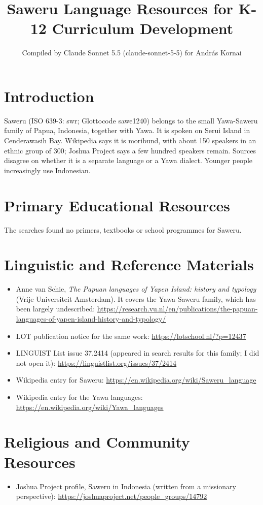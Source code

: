\documentclass[12pt]{article}
\title{Saweru Language Resources for K-12 Curriculum Development}
\author{Compiled by Claude Sonnet 5.5 (claude-sonnet-5-5) for Andr\'as Kornai}
\date{}
\begin{document}
\maketitle

\section{Introduction}
Saweru (ISO 639-3: swr; Glottocode sawe1240) belongs to the small Yawa-Saweru family of Papua, Indonesia, together with Yawa. It is spoken on Serui Island in Cenderawasih Bay. Wikipedia says it is moribund, with about 150 speakers in an ethnic group of 300; Joshua Project says a few hundred speakers remain. Sources disagree on whether it is a separate language or a Yawa dialect. Younger people increasingly use Indonesian.

\section{Primary Educational Resources}
The searches found no primers, textbooks or school programmes for Saweru.

\section{Linguistic and Reference Materials}
\begin{itemize}
\item Anne van Schie, \emph{The Papuan languages of Yapen Island: history and typology} (Vrije Universiteit Amsterdam). It covers the Yawa-Saweru family, which has been largely undescribed: \url{https://research.vu.nl/en/publications/the-papuan-languages-of-yapen-island-history-and-typology/}
\item LOT publication notice for the same work: \url{https://lotschool.nl/?p=12437}
\item LINGUIST List issue 37.2414 (appeared in search results for this family; I did not open it): \url{https://linguistlist.org/issues/37/2414}
\item Wikipedia entry for Saweru: \url{https://en.wikipedia.org/wiki/Saweru_language}
\item Wikipedia entry for the Yawa languages: \url{https://en.wikipedia.org/wiki/Yawa_languages}
\end{itemize}

\section{Religious and Community Resources}
\begin{itemize}
\item Joshua Project profile, Saweru in Indonesia (written from a missionary perspective): \url{https://joshuaproject.net/people_groups/14792}
\end{itemize}
\end{document}
